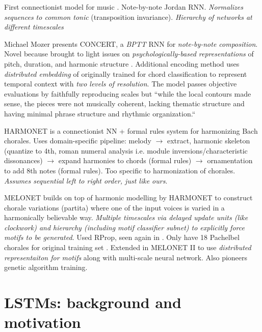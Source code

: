 \documentclass[dissertation.tex]{subfiles}
\begin{document}
First connectionist model for music \cite{todd1988sequential}
\cite{todd1989connectionist} \cite{bharucha1989modeling}. Note-by-note Jordan
RNN. \emph{Normalizes sequences to common tonic} (transposition invariance).
\emph{Hierarchy of networks at different timescales}

Michael Mozer \cite{mozer1994neural} presents CONCERT, a \emph{BPTT} RNN
for \emph{note-by-note composition}. Novel because brought to light issues on
\emph{psychologically-based representations} of pitch, duration, and harmonic
structure \cite{shepard1982geometrical}. Additional encoding method uses
\emph{distributed embedding} of \cite{laden1989representation} originally trained for
chord classification  to represent temporal
context with \emph{two levels of resolution}. The model passes objective evaluations
by faithfully reproducing scales but ``while the local contours made sense, the
pieces were not musically coherent, lacking thematic structure and having
minimal phrase structure and rhythmic organization.``

HARMONET \cite{hild1991harmonet} is a connectionist NN + formal rules system
for harmonizing Bach chorales. Uses domain-specific pipeline: melody $\to$
extract, harmonic skeleton (quantize to 4th, roman numeral analysis i.e. module
inversions/characteristic dissonances) $\to$ expand harmonies to chords (formal rules) $\to$
ornamentation to add 8th notes (formal rules). Too specific to harmonization of chorales.
\emph{Assumes sequential left to right order, just like ours}.

MELONET \cite{feulner1994melonet} builds on top of harmonic modelling by
HARMONET to construct chorale variations (partita) where one of the input
voices is varied in a harmonically believable way. \emph{Multiple timescales
via delayed update units (like clockwork) and hierarchy (including motif
classifier subnet) to explicitly force motifs to be generated}. Used
RProp\cite{riedmiller1993direct}, seen again in \cite{Liu2014}. Only have 18
Pachelbel chorales for original training set \cite{hornel1997melonet}.
Extended in MELONET II \cite{hornel1996learning} to use \emph{distributed
representaiton for motifs} along with multi-scale neural network. Also pioneers
genetic algorithm training.

\section{LSTMs: background and motivation}
\end{document}

